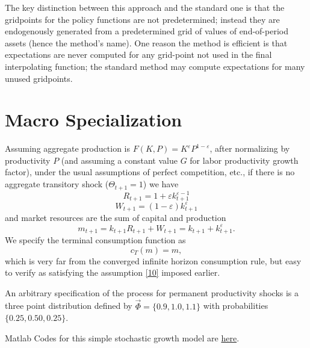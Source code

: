 \documentclass[12pt]{article}
\theoremstyle{definition}
\begin{document}
The key distinction between this approach and the standard one is that the gridpoints for the policy functions are not predetermined; instead they are endogenously generated from a predetermined grid of values of end-of-period assets (hence the method's name). One reason the method is efficient is that expectations are never computed for any grid-point not used in the final interpolating function; the standard method may compute expectations for many unused gridpoints.

\section{Macro Specialization}
Assuming aggregate production is $F(K, P) = K^\varepsilon P^{1-\varepsilon}$, after normalizing by productivity $P$ (and assuming a constant value $G$ for labor productivity growth factor), under the usual assumptions of perfect competition, etc., if there is no aggregate transitory shock ($\Theta_{t+1} = 1$) we have 
\begin{equation}
	\label{19}
	R_{t+1} = 1 + \varepsilon k_{t+1}^{\varepsilon-1}
\end{equation}
\begin{equation}
	\label{20}
	W_{t+1} = (1- \varepsilon)k_{t+1}^{\varepsilon}
\end{equation}
and market resources are the sum of capital and production
\begin{equation}
	\label{2122}
	m_{t+1} = k_{t+1}R_{t+1} + W_{t+1} = k_{t+1} + k_{t+1}^{\varepsilon}.
\end{equation}
We specify the terminal consumption function as 
\begin{equation}
	\label{23}
	c_T(m) = m,
\end{equation}
which is very far from the converged infinite horizon consumption rule, but easy to verify as satisfying the assumption \ref{10} imposed earlier.

An arbitrary specification of the process for permanent productivity shocks is a three point distribution defined by $\overrightarrow{\Phi} = \{0.9, 1.0, 1.1\}$ with probabilities $\{0.25, 0.50, 0.25\}$.

Matlab Codes for this simple stochastic growth model are \href{https://wangwz95.github.io/Documents/Courses' information_Wenzhi-Wang.pdf}{here}.
\end{document}
